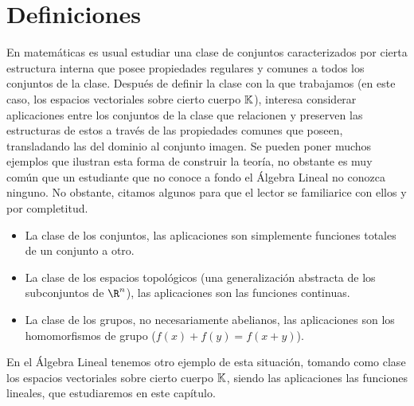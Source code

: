 \documentclass[../algebra_lineal.tex]{subfiles}
\begin{document}
\section{Definiciones}
En matemáticas es usual estudiar una clase de conjuntos caracterizados por cierta estructura interna que posee propiedades regulares y comunes a todos los conjuntos de la clase. Después de definir la clase con la que trabajamos (en este caso, los espacios vectoriales sobre cierto cuerpo $\mathbb{K}$), interesa considerar aplicaciones entre los conjuntos de la clase que relacionen y preserven las estructuras de estos a través de las propiedades comunes que poseen, transladando las del dominio al conjunto imagen. Se pueden poner muchos ejemplos que ilustran esta forma de construir la teoría, no obstante es muy común que un estudiante que no conoce a fondo el Álgebra Lineal no conozca ninguno. No obstante, citamos algunos para que el lector se familiarice con ellos y por completitud.
\begin{itemize}
\item La clase de los conjuntos, las aplicaciones son simplemente funciones totales de un conjunto a otro.
\item La clase de los espacios topológicos (una generalización abstracta de los subconjuntos de $\R^n$), las aplicaciones son las funciones continuas.
\item La clase de los grupos, no necesariamente abelianos, las aplicaciones son los homomorfismos de grupo ($f(x)+f(y)=f(x+y)$).
\end{itemize}
En el Álgebra Lineal tenemos otro ejemplo de esta situación, tomando como clase los espacios vectoriales sobre cierto cuerpo $\mathbb{K}$, siendo las aplicaciones las funciones lineales, que estudiaremos en este capítulo.
\end{document}
